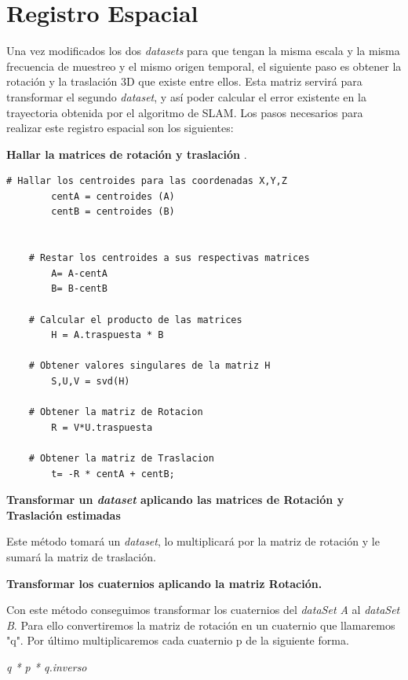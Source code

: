 	 



\section{Registro Espacial}
Una vez modificados los dos \textit{datasets} para que tengan la misma escala y la misma frecuencia de muestreo y el mismo origen temporal, el siguiente paso es obtener la rotación y la traslación 3D que existe entre ellos. Esta matriz servirá para transformar el segundo \textit{dataset}, y así poder calcular el error existente en la trayectoria obtenida por el algoritmo de SLAM.
Los pasos necesarios para realizar este registro espacial son los siguientes:

\textbf{Hallar la matrices de rotación y traslación} .

	\begin{lstlisting}[frame=single]
    # Hallar los centroides para las coordenadas X,Y,Z 
    	centA = centroides (A)
    	centB = centroides (B)
    

    # Restar los centroides a sus respectivas matrices
      	A= A-centA
      	B= B-centB
    
    # Calcular el producto de las matrices
    	H = A.traspuesta * B

    # Obtener valores singulares de la matriz H
    	S,U,V = svd(H)
    
    # Obtener la matriz de Rotacion
      	R = V*U.traspuesta

    # Obtener la matriz de Traslacion
    	t= -R * centA + centB;  
    \end{lstlisting}

\textbf{Transformar un \textit{dataset} aplicando las matrices de Rotación y Traslación estimadas}

Este método tomará un \textit{dataset}, lo multiplicará por la matriz de rotación y le sumará la matriz de traslación.

\textbf{Transformar los cuaternios aplicando la matriz Rotación.}

Con este método conseguimos transformar los cuaternios del \textit{dataSet A} al \textit{dataSet B}. Para ello convertiremos la matriz de rotación en un cuaternio que llamaremos "q". Por último multiplicaremos cada cuaternio p de la siguiente forma.
\begin{center}
		\textit{q * p * q.inverso }
\end{center}

